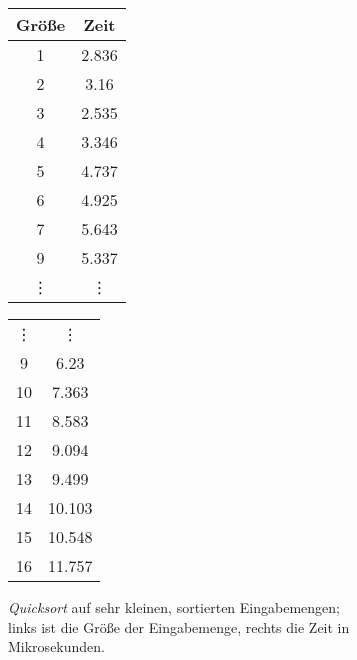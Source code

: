 \begin{figure}[ht]
    \begin{subfigure}[c]{0.49\textwidth}
        \begin{minipage}[t]{0.49\textwidth}
            \centering
            \begin{tabular}{c c}
                \toprule
                Größe & Zeit \\
                \midrule
                1 & 2.836\\
                2 & 3.16\\
                3 & 2.535\\
                4 & 3.346\\
                5 & 4.737\\
                6 & 4.925\\
                7 & 5.643\\
                9 & 5.337\\
                \vdots & \vdots \\
            \end{tabular}
        \end{minipage}
        \hfill
        \begin{minipage}[c]{0.49\textwidth}
            \begin{tabular}{c c}
                \vdots & \vdots \\
                9 & 6.23\\
                10& 7.363\\
                11& 8.583\\
                12& 9.094\\
                13& 9.499\\
                14& 10.103\\
                15& 10.548\\
                16& 11.757\\
                \bottomrule
            \end{tabular}
        \end{minipage}
        \caption{
            \emph{Quicksort} auf sehr kleinen, sortierten Eingabemengen; links ist die Größe der Eingabemenge, rechts die Zeit in Mikrosekunden.\label{subfig:funkterm-beispieldaten}
        }
    \end{subfigure}
    \hfill
    \begin{subfigure}[c]{0.49\textwidth}
        \begin{tikzpicture}

\end{tikzpicture}
\end{subfigure}
\end{figure}
